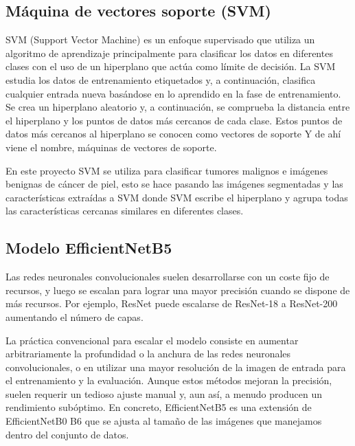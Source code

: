 	\subsection{Máquina de vectores soporte (SVM)}\label{sub:svm}
SVM (Support Vector Machine) es un enfoque supervisado que utiliza un algoritmo de aprendizaje principalmente para clasificar los datos en diferentes 
clases con el uso de un hiperplano que actúa como límite de decisión. 
La SVM estudia los datos de entrenamiento etiquetados y, a continuación, clasifica cualquier entrada nueva basándose en lo aprendido en la fase de 
entrenamiento. 
Se crea un hiperplano aleatorio y, a continuación, se comprueba la distancia entre el hiperplano y los puntos de datos más cercanos de cada clase. 
Estos puntos de datos más cercanos al hiperplano se conocen como vectores de soporte Y de ahí viene el nombre, máquinas de vectores de soporte.

En este proyecto SVM se utiliza para clasificar tumores malignos e imágenes benignas de cáncer de piel, esto se hace pasando las imágenes segmentadas 
y las características extraídas a SVM donde SVM escribe el hiperplano y agrupa todas las características cercanas similares en diferentes clases.

	\subsection{Modelo EfficientNetB5}\label{sub:efficientnetB5}
Las redes neuronales convolucionales %
suelen desarrollarse con un coste fijo de recursos, y luego se escalan para lograr una mayor precisión cuando se dispone de más recursos. 
Por ejemplo, ResNet puede escalarse de ResNet-18 a ResNet-200 aumentando el número de capas.

La práctica convencional para escalar el modelo consiste en aumentar arbitrariamente la profundidad o la anchura de las redes neuronales convolucionales, o en utilizar una mayor resolución de la imagen de entrada para el entrenamiento y la evaluación. 
Aunque estos métodos mejoran la precisión, suelen requerir un tedioso ajuste manual y, aun así, a menudo producen un rendimiento subóptimo.
En concreto, EfficientNetB5 %
es una extensión de EfficientNetB0 \- B6 que se ajusta al tamaño de las imágenes que manejamos dentro del conjunto de datos.

